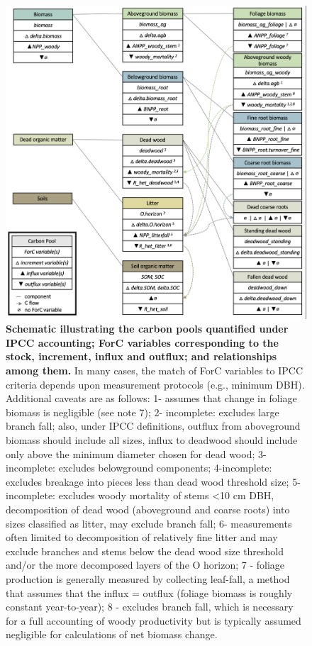 \documentclass[, manuscript]{copernicus}
\begin{document}
\begin{figure}
\includegraphics[width=15cm]{figures_tables/C_variable_mapping} \caption{\textbf{Schematic illustrating the carbon pools quantified under IPCC accounting; ForC variables corresponding to the stock, increment, influx and outflux; and relationships among them.} In many cases, the match of ForC variables to IPCC criteria depends upon measurement protocols (e.g., minimum DBH). Additional caveats are as follows: 1- assumes that change in foliage biomass is negligible (see note 7); 2- incomplete: excludes large branch fall; also, under IPCC definitions, outflux from aboveground biomass should include all sizes, influx to deadwood should include only above the minimum diameter chosen for dead wood; 3- incomplete: excludes belowground components;  4-incomplete: excludes breakage into pieces less than dead wood threshold size; 5-incomplete: excludes woody mortality of stems <10 cm DBH, decomposition of dead wood (aboveground and coarse roots) into sizes classified as litter, may exclude branch fall; 6- measurements often limited to decomposition of relatively fine litter and may exclude branches and stems below the dead wood size threshold and/or the more decomposed layers of the O horizon; 7 - foliage production is generally measured by collecting leaf-fall, a method that assumes that the influx = outflux (foliage biomass is roughly constant year-to-year); 8 - excludes branch fall, which is necessary for a full accounting of woody productivity but is typically assumed negligible for calculations of net biomass change.}\label{fig:fig_variable_mapping}
\end{figure}
\end{document}
